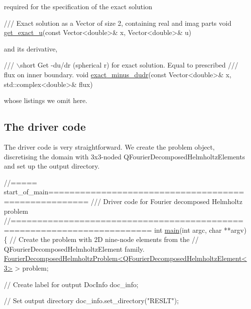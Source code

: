 required for the specification of the exact solution


\begin{DoxyCodeInclude}
 \textcolor{comment}{/// Exact solution as a Vector of size 2, containing real and imag parts}
 \textcolor{keywordtype}{void} \hyperlink{namespacePlanarWave_a00f252bcf0181187c656a58ce36b07b5}{get\_exact\_u}(\textcolor{keyword}{const} Vector<double>& x, Vector<double>& u)

\end{DoxyCodeInclude}


and its derivative,


\begin{DoxyCodeInclude}
 \textcolor{comment}{/// \(\backslash\)short Get -du/dr (spherical r) for exact solution. Equal to prescribed}
\textcolor{comment}{ /// flux on inner boundary.}
\textcolor{comment}{} \textcolor{keywordtype}{void} \hyperlink{namespaceProblemParameters_aa544d1f3e384d3283f7113512931ea8f}{exact\_minus\_dudr}(\textcolor{keyword}{const} Vector<double>& x, std::complex<double>& flux)

\end{DoxyCodeInclude}


whose listings we omit here.



 

\hypertarget{index_main}{}\subsection{The driver code}\label{index_main}
The driver code is very straightforward. We create the problem object, discretising the domain with 3x3-\/noded {\ttfamily Q\+Fourier\+Decomposed\+Helmholtz\+Elements} and set up the output directory.

 
\begin{DoxyCodeInclude}
\textcolor{comment}{//===== start\_of\_main=====================================================}
\textcolor{comment}{/// Driver code for Fourier decomposed Helmholtz problem}
\textcolor{comment}{}\textcolor{comment}{//========================================================================}
\textcolor{keywordtype}{int} \hyperlink{sphere__scattering_8cc_a3c04138a5bfe5d72780bb7e82a18e627}{main}(\textcolor{keywordtype}{int} argc, \textcolor{keywordtype}{char} **argv)
\{
 \textcolor{comment}{// Create the problem with 2D nine-node elements from the}
 \textcolor{comment}{// QFourierDecomposedHelmholtzElement family. }
 \hyperlink{classFourierDecomposedHelmholtzProblem}{FourierDecomposedHelmholtzProblem<QFourierDecomposedHelmholtzElement<3>}
       > 
  problem;
 
 \textcolor{comment}{// Create label for output}
 DocInfo doc\_info;
 
 \textcolor{comment}{// Set output directory}
 doc\_info.set\_directory(\textcolor{stringliteral}{"RESLT"});

\end{DoxyCodeInclude}


